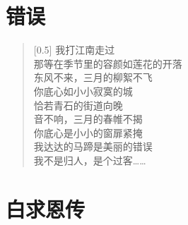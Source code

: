 \documentclass[12pt,UTF-8,openany]{ctexbook}
\begin{document}
\chapter{错误}

\begin{normalsize}
    
    \begin{verse}[0.5\linewidth]
        我打江南走过 \\
        那等在季节里的容颜如莲花的开落 \\
        东风不来，三月的柳絮不飞 \\
        你底心如小小寂寞的城 \\
        恰若青石的街道向晚 \\
        音不响，三月的春帷不揭 \\
        你底心是小小的窗扉紧掩 \\
        我达达的马蹄是美丽的错误 \\
        我不是归人，是个过客……
    \end{verse}
    
\end{normalsize}



\chapter{白求恩传}
\end{document}
